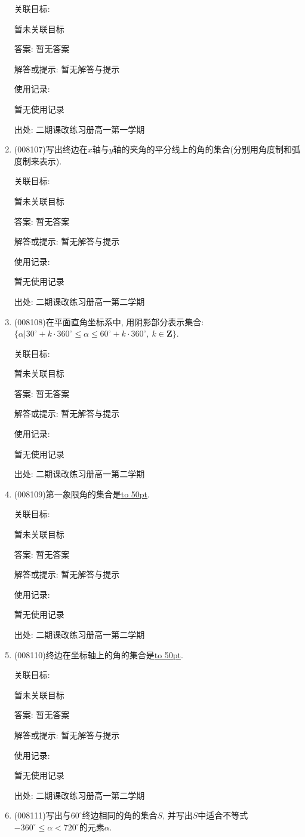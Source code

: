 \documentclass[10pt,a4paper]{article}
\newcommand{\blank}[1]{\underline{\hbox to #1pt{}}}
\begin{document}
\begin{enumerate}[1.]
关联目标:

暂未关联目标

答案: 暂无答案

解答或提示: 暂无解答与提示

使用记录:

暂无使用记录


出处: 二期课改练习册高一第一学期
\item { (008107)}写出终边在$x$轴与$y$轴的夹角的平分线上的角的集合(分别用角度制和弧度制来表示).


关联目标:

暂未关联目标

答案: 暂无答案

解答或提示: 暂无解答与提示

使用记录:

暂无使用记录


出处: 二期课改练习册高一第二学期
\item { (008108)}在平面直角坐标系中, 用阴影部分表示集合: $\{\alpha|30^\circ+k\cdot 360^\circ\le \alpha \le 60^\circ+k\cdot 360^\circ, \ k\in \mathbf{Z}\}$.


关联目标:

暂未关联目标

答案: 暂无答案

解答或提示: 暂无解答与提示

使用记录:

暂无使用记录


出处: 二期课改练习册高一第二学期
\item { (008109)}第一象限角的集合是\blank{50}.


关联目标:

暂未关联目标

答案: 暂无答案

解答或提示: 暂无解答与提示

使用记录:

暂无使用记录


出处: 二期课改练习册高一第二学期
\item { (008110)}终边在坐标轴上的角的集合是\blank{50}.


关联目标:

暂未关联目标

答案: 暂无答案

解答或提示: 暂无解答与提示

使用记录:

暂无使用记录


出处: 二期课改练习册高一第二学期
\item { (008111)}写出与$60^\circ$终边相同的角的集合$S$, 并写出$S$中适合不等式$-360^\circ\le \alpha <720^\circ$的元素$\alpha$.



\end{enumerate}
\end{document}
